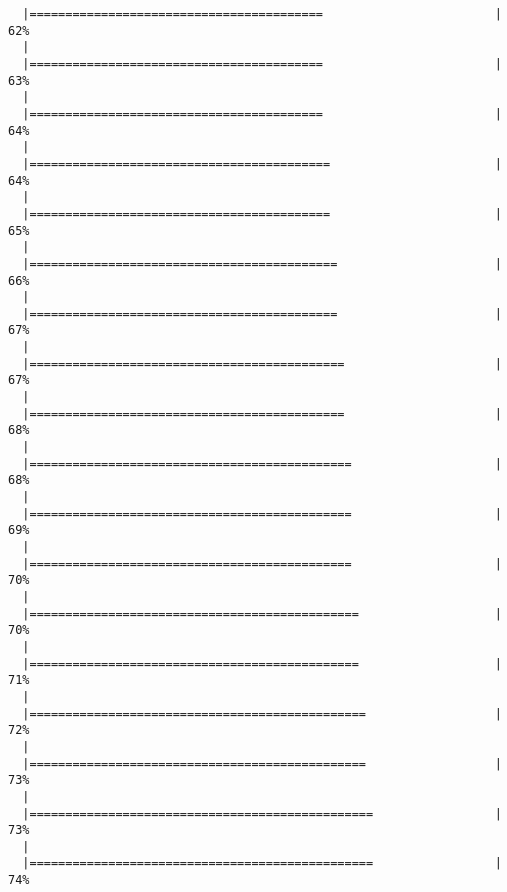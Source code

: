 \begin{knitrout}
\begin{kframe}
\begin{verbatim}
  |=========================================                        |  62%
  |                                                                       
  |=========================================                        |  63%
  |                                                                       
  |=========================================                        |  64%
  |                                                                       
  |==========================================                       |  64%
  |                                                                       
  |==========================================                       |  65%
  |                                                                       
  |===========================================                      |  66%
  |                                                                       
  |===========================================                      |  67%
  |                                                                       
  |============================================                     |  67%
  |                                                                       
  |============================================                     |  68%
  |                                                                       
  |=============================================                    |  68%
  |                                                                       
  |=============================================                    |  69%
  |                                                                       
  |=============================================                    |  70%
  |                                                                       
  |==============================================                   |  70%
  |                                                                       
  |==============================================                   |  71%
  |                                                                       
  |===============================================                  |  72%
  |                                                                       
  |===============================================                  |  73%
  |                                                                       
  |================================================                 |  73%
  |                                                                       
  |================================================                 |  74%

\end{verbatim}
\end{kframe}
\end{knitrout}
